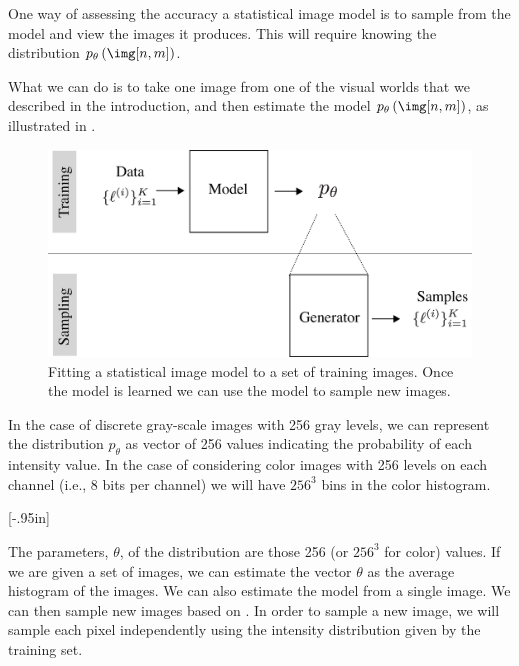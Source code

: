 One way of assessing the accuracy a statistical image model is to sample from the model and view the images it produces. This will require knowing the distribution $p_{\theta}\left(\img [n,m] \right)$. 

What we can do is to take one image from one of the visual worlds that we described in the introduction, and then estimate the model $p_{\theta}\left(\img [n,m] \right)$, as illustrated in \fig{\ref{fig:model_training_vs_sampling}}. 

\begin{figure}
\centerline{
\includegraphics[width=.75\linewidth]{figures/statistical_image_models/model_training_vs_sampling.eps}
} 
\caption{Fitting a statistical image model to a set of training images. Once the model is learned we can use the model to sample new images.} 
\label{fig:model_training_vs_sampling}
\end{figure}



In the case of discrete gray-scale images with 256 gray levels, we can represent the distribution $p_{\theta}$ as vector of 256 values indicating the probability of each intensity value. In the case of considering color images with 256 levels on each channel (i.e., 8 bits per channel) we will have $256^3$ bins in the color histogram.

[-.95in]

The parameters, $\theta$, of the distribution are those 256 (or $256^3$ for color) values.  
If we are given a set of images, we can estimate the vector $\theta$ as the average histogram of the images. 
We can also estimate the model from a single image. We can then sample new images based on \eqn{\ref{eq:histmodel}}. In order to sample a new image, we will sample each pixel independently using the intensity distribution given by the training set. 


